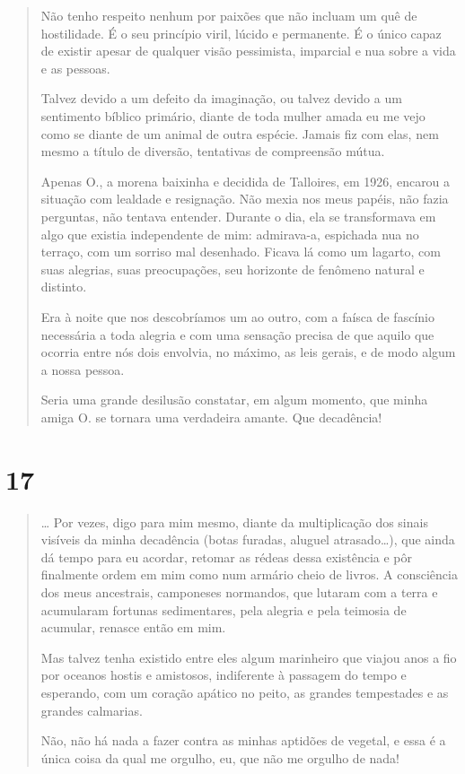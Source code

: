 \begin{quote}
Não tenho respeito nenhum por paixões que não incluam um quê de
hostilidade. É o seu princípio viril, lúcido e permanente. É o único
capaz de existir apesar de qualquer visão pessimista, imparcial e nua
sobre a vida e as pessoas.

Talvez devido a um defeito da imaginação, ou talvez devido a um
sentimento bíblico primário, diante de toda mulher amada eu me vejo como
se diante de um animal de outra espécie. Jamais fiz com elas, nem mesmo
a título de diversão, tentativas de compreensão mútua.

Apenas O., a morena baixinha e decidida de Talloires, em 1926, encarou a
situação com lealdade e resignação. Não mexia nos meus papéis, não fazia
perguntas, não tentava entender. Durante o dia, ela se transformava em
algo que existia independente de mim: admirava-a, espichada nua no
terraço, com um sorriso mal desenhado. Ficava lá como um lagarto, com
suas alegrias, suas preocupações, seu horizonte de fenômeno natural e
distinto.

Era à noite que nos descobríamos um ao outro, com a faísca de fascínio
necessária a toda alegria e com uma sensação precisa de que aquilo que
ocorria entre nós dois envolvia, no máximo, as leis gerais, e de modo
algum a nossa pessoa.

Seria uma grande desilusão constatar, em algum momento, que minha amiga
O. se tornara uma verdadeira amante. Que decadência!
\end{quote}

\section{17}\label{section-16}

\begin{quote}
\ldots{} Por vezes, digo para mim mesmo, diante da multiplicação dos
sinais visíveis da minha decadência (botas furadas, aluguel
atrasado\ldots{}), que ainda dá tempo para eu acordar, retomar as rédeas
dessa existência e pôr finalmente ordem em mim como num armário cheio de
livros. A consciência dos meus ancestrais, camponeses normandos, que
lutaram com a terra e acumularam fortunas sedimentares, pela alegria e
pela teimosia de acumular, renasce então em mim.

Mas talvez tenha existido entre eles algum marinheiro que viajou anos a
fio por oceanos hostis e amistosos, indiferente à passagem do tempo e
esperando, com um coração apático no peito, as grandes tempestades e as
grandes calmarias.

Não, não há nada a fazer contra as minhas aptidões de vegetal, e essa é
a única coisa da qual me orgulho, eu, que não me orgulho de nada!
\end{quote}

